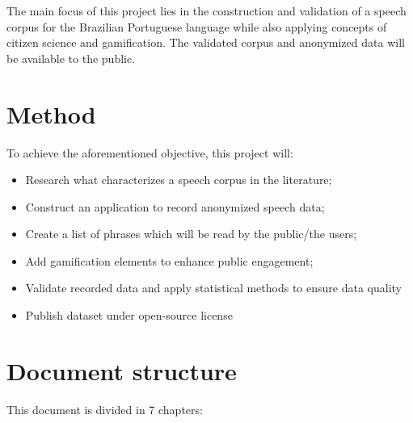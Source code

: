 The main focus of this project lies in the construction and validation of a speech corpus for the Brazilian Portuguese language while also applying concepts of citizen science and gamification. The validated corpus and anonymized data will be available to the public.

\section*{Method}

To achieve the aforementioned objective, this project will:

\begin{itemize}
    \item Research what characterizes a speech corpus in the literature;
    \item Construct an application to record anonymized speech data;
    \item Create a list of phrases which will be read by the public/the users;
    \item Add gamification elements to enhance public engagement;
    \item Validate recorded data and apply statistical methods to ensure data quality
    \item Publish dataset under open-source license
\end{itemize}

\section*{Document structure}

This document is divided in 7 chapters:

